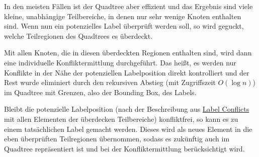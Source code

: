 In den meisten Fällen ist der Quadtree aber effizient und das Ergebnis sind viele kleine, unabhängige Teilbereiche, in denen nur sehr wenige Knoten enthalten sind.
Wenn nun ein potenzielles Label überprüft werden soll, so wird geguckt, welche Teilregionen des Quadtrees es überdeckt.

Mit allen Knoten, die in diesen überdeckten Regionen enthalten sind, wird dann eine individuelle Konfliktermittlung durchgeführt.
Das heißt, es werden nur Konflikte in der Nähe der potenziellen Labelposition direkt kontrolliert und der Rest wurde eliminiert
durch den rekursiven Abstieg (mit Zugriffszeit $O (\log n)$) im Quadtree mit Grenzen, also der Bounding Box, des Labels.

Bleibt die potenzielle Labelposition (nach der Beschreibung aus \hyperref[subsubsec:label_conflict]{Label Conflicts} mit allen Elementen der überdecken Teilbereiche) konfliktfrei,
so kann es zu einem tatsächlichen Label gemacht werden.
Dieses wird als neues Element in die eben überprüften Teilregionen übernommen, sodass es zukünftig auch im Quadtree repräsentiert ist und bei der Konfliktermittlung berücksichtigt wird.

